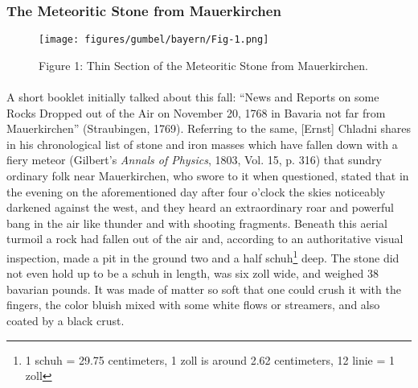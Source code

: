 \documentclass[a4paper, 12pt, oneside]{article}
\begin{document}
\subsubsection{The Meteoritic Stone from Mauerkirchen}
\begin{figure}[h]
\centering
\texttt{[image: figures/gumbel/bayern/Fig-1.png]}
\caption{Figure 1: Thin Section of the Meteoritic Stone from Mauerkirchen.}
\end{figure}
\paragraph*{}
A short booklet initially talked about this fall: ``News and Reports on some Rocks Dropped out of the Air on November 20, 1768 in Bavaria not far from Mauerkirchen'' (Straubingen, 1769). Referring to the same, [Ernst] Chladni shares in his chronological list of stone and iron masses which have fallen down with a fiery meteor (Gilbert's \emph{Annals of Physics}, 1803, Vol. 15, p. 316) that sundry ordinary folk near Mauerkirchen, who swore to it when questioned, stated that in the evening on the aforementioned day after four o'clock the skies noticeably darkened against the west, and they heard an extraordinary roar and powerful bang in the air like thunder and with shooting fragments. Beneath this aerial turmoil a rock had fallen out of the air and, according to an authoritative visual inspection, made a pit in the ground two and a half schuh\footnote{1 schuh = 29.75 centimeters, 1 zoll is around 2.62 centimeters, 12 linie = 1 zoll} deep. The stone did not even hold up to be a schuh in length, was six zoll wide, and weighed 38 bavarian pounds. It was made of matter so soft that one could crush it with the fingers, the color bluish mixed with some white flows or streamers, and also coated by a black crust.
\end{document}
